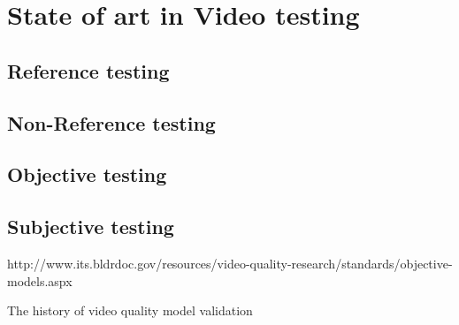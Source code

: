 
\section{State of art in Video testing}
\subsection{Reference testing}

\subsection{Non-Reference testing}

\subsection{Objective testing}

\subsection{Subjective testing}
http://www.its.bldrdoc.gov/resources/video-quality-research/standards/objective-models.aspx


The history of video quality model validation ~\cite{6659332}
